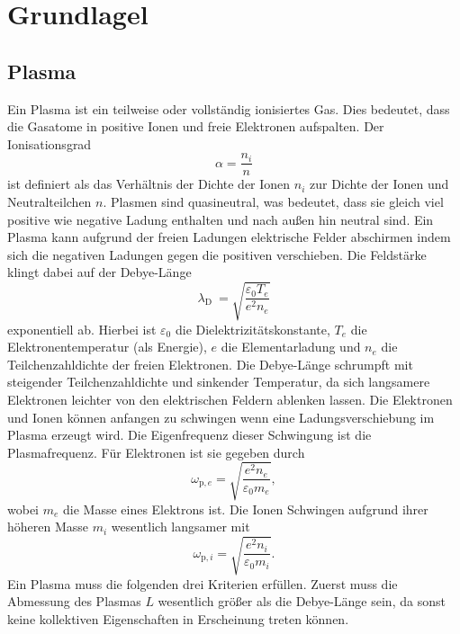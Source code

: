 \section{Grundlagel}

\subsection{Plasma}
Ein Plasma ist ein teilweise oder vollst\"andig ionisiertes Gas.
Dies bedeutet, dass die Gasatome in positive Ionen und freie Elektronen aufspalten.
Der Ionisationsgrad
\begin{equation}
\alpha
    =\frac{n_i}{n}
    \label{eq:a}
\end{equation}
ist definiert als das Verh\"altnis der Dichte der Ionen $n_i$ zur Dichte der Ionen und Neutralteilchen $n$.
Plasmen sind quasineutral, was bedeutet, dass sie gleich viel positive wie negative Ladung enthalten und nach au\ss en hin neutral sind.
Ein Plasma kann aufgrund der freien Ladungen elektrische Felder abschirmen indem sich die negativen Ladungen gegen die positiven verschieben.
Die Feldst\"arke klingt dabei auf der Debye-L\"ange
\begin{equation}
\lambda_\text{D}\
    =\sqrt{\frac{\varepsilon_0 T_e}{e^2n_e}}
    \label{eq:lD}
\end{equation}
exponentiell ab.
Hierbei ist $\varepsilon_0$ die Dielektrizit\"atskonstante, $T_e$ die Elektronentemperatur (als Energie), $e$ die Elementarladung und $n_e$ die Teilchenzahldichte der freien Elektronen.
Die Debye-L\"ange schrumpft mit steigender Teilchenzahldichte und sinkender Temperatur, da sich langsamere Elektronen leichter von den elektrischen Feldern ablenken lassen.
Die Elektronen und Ionen k\"onnen anfangen zu schwingen wenn eine Ladungsverschiebung im Plasma erzeugt wird.
Die Eigenfrequenz dieser Schwingung ist die Plasmafrequenz.
F\"ur Elektronen ist sie gegeben durch
\begin{equation}
\omega_{\text{p},e}
    =\sqrt{\frac{e^2n_e}{\varepsilon_0m_e}},
    \label{eq:wpe}
\end{equation}
wobei $m_e$ die Masse eines Elektrons ist.
Die Ionen Schwingen aufgrund ihrer h\"oheren Masse $m_i$ wesentlich langsamer mit
\begin{equation}
\omega_{\text{p},i}
    =\sqrt{\frac{e^2n_i}{\varepsilon_0m_i}}.
    \label{eq:wpi}
\end{equation}
Ein Plasma muss die folgenden drei Kriterien erf\"ullen.
Zuerst muss die Abmessung des Plasmas $L$ wesentlich gr\"o\ss er als die Debye-L\"ange sein, da sonst keine kollektiven Eigenschaften in Erscheinung treten k\"onnen.
